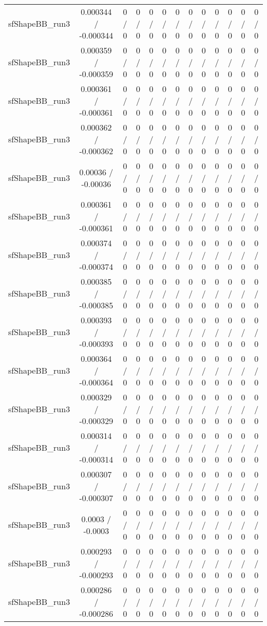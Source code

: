 \documentclass[10pt]{article}
\begin{document}
\begin{table}[htbp]
\begin{center}
\begin{tabular}{|c|c|c|c|c|c|c|c|c|c|c|c|c|}
  sfShapeBB_run3 & 0.000344 / -0.000344 & 0 / 0 & 0 / 0 & 0 / 0 & 0 / 0 & 0 / 0 & 0 / 0 & 0 / 0 & 0 / 0 & 0 / 0 & 0 / 0 & 0 / 0 \\ 
  sfShapeBB_run3 & 0.000359 / -0.000359 & 0 / 0 & 0 / 0 & 0 / 0 & 0 / 0 & 0 / 0 & 0 / 0 & 0 / 0 & 0 / 0 & 0 / 0 & 0 / 0 & 0 / 0 \\ 
  sfShapeBB_run3 & 0.000361 / -0.000361 & 0 / 0 & 0 / 0 & 0 / 0 & 0 / 0 & 0 / 0 & 0 / 0 & 0 / 0 & 0 / 0 & 0 / 0 & 0 / 0 & 0 / 0 \\ 
  sfShapeBB_run3 & 0.000362 / -0.000362 & 0 / 0 & 0 / 0 & 0 / 0 & 0 / 0 & 0 / 0 & 0 / 0 & 0 / 0 & 0 / 0 & 0 / 0 & 0 / 0 & 0 / 0 \\ 
  sfShapeBB_run3 & 0.00036 / -0.00036 & 0 / 0 & 0 / 0 & 0 / 0 & 0 / 0 & 0 / 0 & 0 / 0 & 0 / 0 & 0 / 0 & 0 / 0 & 0 / 0 & 0 / 0 \\ 
  sfShapeBB_run3 & 0.000361 / -0.000361 & 0 / 0 & 0 / 0 & 0 / 0 & 0 / 0 & 0 / 0 & 0 / 0 & 0 / 0 & 0 / 0 & 0 / 0 & 0 / 0 & 0 / 0 \\ 
  sfShapeBB_run3 & 0.000374 / -0.000374 & 0 / 0 & 0 / 0 & 0 / 0 & 0 / 0 & 0 / 0 & 0 / 0 & 0 / 0 & 0 / 0 & 0 / 0 & 0 / 0 & 0 / 0 \\ 
  sfShapeBB_run3 & 0.000385 / -0.000385 & 0 / 0 & 0 / 0 & 0 / 0 & 0 / 0 & 0 / 0 & 0 / 0 & 0 / 0 & 0 / 0 & 0 / 0 & 0 / 0 & 0 / 0 \\ 
  sfShapeBB_run3 & 0.000393 / -0.000393 & 0 / 0 & 0 / 0 & 0 / 0 & 0 / 0 & 0 / 0 & 0 / 0 & 0 / 0 & 0 / 0 & 0 / 0 & 0 / 0 & 0 / 0 \\ 
  sfShapeBB_run3 & 0.000364 / -0.000364 & 0 / 0 & 0 / 0 & 0 / 0 & 0 / 0 & 0 / 0 & 0 / 0 & 0 / 0 & 0 / 0 & 0 / 0 & 0 / 0 & 0 / 0 \\ 
  sfShapeBB_run3 & 0.000329 / -0.000329 & 0 / 0 & 0 / 0 & 0 / 0 & 0 / 0 & 0 / 0 & 0 / 0 & 0 / 0 & 0 / 0 & 0 / 0 & 0 / 0 & 0 / 0 \\ 
  sfShapeBB_run3 & 0.000314 / -0.000314 & 0 / 0 & 0 / 0 & 0 / 0 & 0 / 0 & 0 / 0 & 0 / 0 & 0 / 0 & 0 / 0 & 0 / 0 & 0 / 0 & 0 / 0 \\ 
  sfShapeBB_run3 & 0.000307 / -0.000307 & 0 / 0 & 0 / 0 & 0 / 0 & 0 / 0 & 0 / 0 & 0 / 0 & 0 / 0 & 0 / 0 & 0 / 0 & 0 / 0 & 0 / 0 \\ 
  sfShapeBB_run3 & 0.0003 / -0.0003 & 0 / 0 & 0 / 0 & 0 / 0 & 0 / 0 & 0 / 0 & 0 / 0 & 0 / 0 & 0 / 0 & 0 / 0 & 0 / 0 & 0 / 0 \\ 
  sfShapeBB_run3 & 0.000293 / -0.000293 & 0 / 0 & 0 / 0 & 0 / 0 & 0 / 0 & 0 / 0 & 0 / 0 & 0 / 0 & 0 / 0 & 0 / 0 & 0 / 0 & 0 / 0 \\ 
  sfShapeBB_run3 & 0.000286 / -0.000286 & 0 / 0 & 0 / 0 & 0 / 0 & 0 / 0 & 0 / 0 & 0 / 0 & 0 / 0 & 0 / 0 & 0 / 0 & 0 / 0 & 0 / 0 \\ 

\end{tabular}
\end{center}
\end{table}
\end{document}
